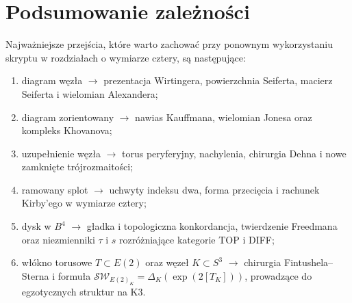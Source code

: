 \section*{Podsumowanie zależności}
Najważniejsze przejścia, które warto zachować przy ponownym
wykorzystaniu skryptu w rozdziałach o wymiarze cztery, są następujące:
\begin{enumerate}[label=(\roman*)]
\item diagram węzła $\longrightarrow$ prezentacja Wirtingera,
powierzchnia Seiferta, macierz Seiferta i wielomian Alexandera;
\item diagram zorientowany $\longrightarrow$ nawias Kauffmana,
wielomian Jonesa oraz kompleks Khovanova;
\item uzupełnienie węzła $\longrightarrow$ torus peryferyjny,
nachylenia, chirurgia Dehna i nowe zamknięte trójrozmaitości;
\item ramowany splot $\longrightarrow$ uchwyty indeksu dwa,
forma przecięcia i rachunek Kirby'ego w wymiarze cztery;
\item dysk w $B^4$ $\longrightarrow$ gładka i topologiczna
konkordancja, twierdzenie Freedmana oraz niezmienniki
$\tau$ i $s$ rozróżniające kategorie TOP i DIFF;
\item włókno torusowe $T\subset E(2)$ oraz węzeł $K\subset S^3$
$\longrightarrow$ chirurgia Fintushela--Sterna i formuła
$\mathcal{SW}_{E(2)_K}=\Delta_K(\exp(2[T_K]))$,
prowadzące do egzotycznych struktur na K3.
\end{enumerate}


